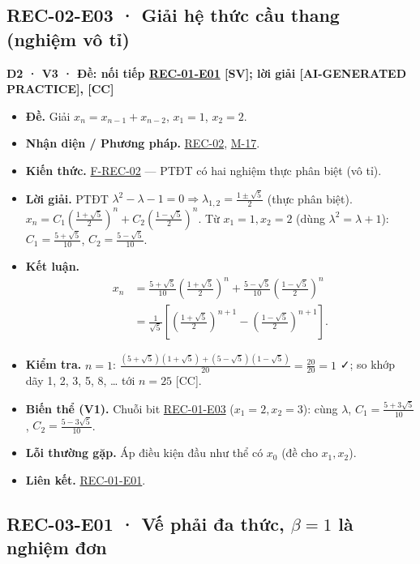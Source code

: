 \documentclass[
  10pt,
  twoside,openany]{book}
\begin{document}
\hypertarget{REC-02-E03}{%
\subsection{REC-02-E03 · Giải hệ thức cầu thang (nghiệm vô
tỉ)}\label{REC-02-E03}}

\textbf{D2 · V3 · Đề: nối tiếp
\protect\hyperlink{REC-01-E01}{REC-01-E01} {[}SV{]}; lời giải
{[}AI-GENERATED PRACTICE{]}, {[}CC{]}}

\begin{itemize}
\item
  \textbf{Đề.} Giải \(x_n=x_{n-1}+x_{n-2}\), \(x_1=1\), \(x_2=2\).
\item
  \textbf{Nhận diện / Phương pháp.} \protect\hyperlink{REC-02}{REC-02},
  \protect\hyperlink{M-17}{M-17}.
\item
  \textbf{Kiến thức.} \protect\hyperlink{F-REC-02}{F-REC-02} --- PTĐT có
  hai nghiệm thực phân biệt (vô tỉ).
\item
  \textbf{Lời giải.} PTĐT
  \(\lambda^2-\lambda-1=0\Rightarrow\lambda_{1,2}=\frac{1\pm\sqrt5}{2}\)
  (thực phân biệt).
  \(x_n=C_1\left(\frac{1+\sqrt5}{2}\right)^n+C_2\left(\frac{1-\sqrt5}{2}\right)^n\).
  Từ \(x_1=1,x_2=2\) (dùng \(\lambda^2=\lambda+1\)):
  \(C_1=\frac{5+\sqrt5}{10}\), \(C_2=\frac{5-\sqrt5}{10}\).
\item
  \textbf{Kết luận.} \[
  \begin{aligned}
  x_n&=\frac{5+\sqrt5}{10}\left(\frac{1+\sqrt5}{2}\right)^n+\frac{5-\sqrt5}{10}\left(\frac{1-\sqrt5}{2}\right)^n\\
  &=\frac{1}{\sqrt5}\left[\left(\frac{1+\sqrt5}{2}\right)^{n+1}-\left(\frac{1-\sqrt5}{2}\right)^{n+1}\right].
  \end{aligned}
  \]
\item
  \textbf{Kiểm tra.} \(n=1\):
  \(\frac{(5+\sqrt5)(1+\sqrt5)+(5-\sqrt5)(1-\sqrt5)}{20}=\frac{20}{20}=1\)
  ✓; so khớp dãy 1, 2, 3, 5, 8, \ldots{} tới \(n=25\) {[}CC{]}.
\item
  \textbf{Biến thể (V1).} Chuỗi bit
  \protect\hyperlink{REC-01-E03}{REC-01-E03} (\(x_1=2,x_2=3\)): cùng
  \(\lambda\), \(C_1=\frac{5+3\sqrt5}{10}\),
  \(C_2=\frac{5-3\sqrt5}{10}\).
\item
  \textbf{Lỗi thường gặp.} Áp điều kiện đầu như thể có \(x_0\) (đề cho
  \(x_1,x_2\)).
\item
  \textbf{Liên kết.} \protect\hyperlink{REC-01-E01}{REC-01-E01}.
\end{itemize}

\hypertarget{REC-03-E01}{%
\subsection{\texorpdfstring{REC-03-E01 · Vế phải đa thức, \(\beta=1\) là
nghiệm
đơn}{REC-03-E01 · Vế phải đa thức, \textbackslash beta=1 là nghiệm đơn}}\label{REC-03-E01}}
\end{document}
